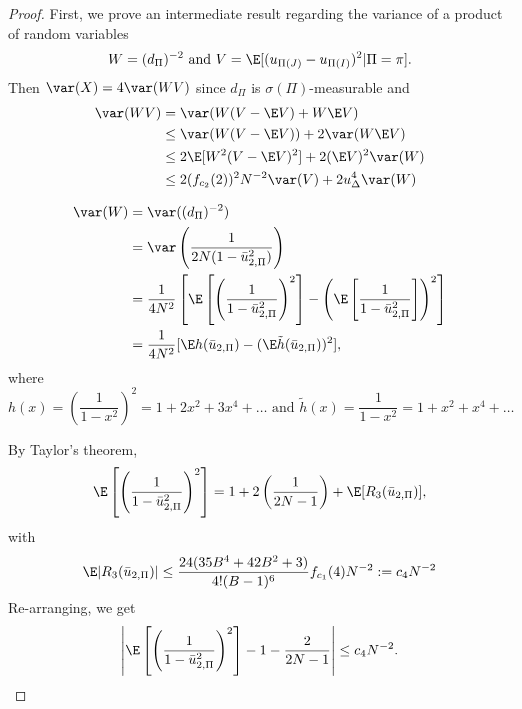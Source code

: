 \begin{proof}
  First, we prove an intermediate result regarding the variance of a product of random variables
  \begin{equation*}
    W = (d_{\Pi})^{-2} \text{ and } V = \E [(u_{\Pi(J)} - u_{\Pi(I)})^2 | \Pi = \pi].
  \end{equation*}
  Then $\var(X) = 4 \var(WV)$ since $d_{\Pi}$ is $\sigma(\Pi)$-measurable and 
  \begin{align}
    \label{E:var_prod}
    \var(WV) &= \var(W(V-\E V) + W \E V) \nonumber \\
    &\leq \var(W(V-\E V)) + 2 \var (W \E V) \nonumber \\
    &\leq 2 \E [W^2 (V-\E V)^2] + 2(\E V)^2 \var(W) \nonumber \\
    &\leq 2(f_{c_2}(2))^2 N^{-2} \var(V) + 2u_{\Delta}^4 \var(W)
  \end{align}
  
  \begin{align*}
    \var(W) &= \var ((d_{\Pi})^{-2}) \\
    &= \var \left ( \frac{1}{2N(1-\bar{u}_{2,\Pi}^2)} \right ) \\
    &= \frac{1}{4N^2} \left [ \E \left [ \left (\frac{1}{1-\bar{u}_{2,\Pi}^2}
        \right )^2 \right ] - 
      \left ( \E \left [ \frac{1}{1-\bar{u}_{2,\Pi}^2} \right ] \right )^2
    \right ] \\
    &= \frac{1}{4N^2}[\E h(\bar{u}_{2,\Pi}) - (\E \tilde{h}(\bar{u}_{2,\Pi}))^2],
  \end{align*}
  where 
  \begin{equation*}
    h(x) = \left ( \frac{1}{1-x^2} \right )^2 = 1 + 2x^2 + 3x^4 + \dots
      \text{ and } \tilde{h}(x) = \frac{1}{1-x^2} = 1 + x^2 + x^4 + \ldots
  \end{equation*}

  By Taylor's theorem,
  \begin{equation*}
    \E \left [ \left (\frac{1}{1-\bar{u}_{2,\Pi}^2} \right )^2 \right ] 
    = 1 + 2 \left ( \frac{1}{2N-1} \right ) + \E [R_3(\bar{u}_{2,\Pi})],
  \end{equation*}
  with
  \begin{equation*}
    \E |R_3(\bar{u}_{2,\Pi})| \leq \frac{24(35B^4 + 42 B^2 + 3)}{4!(B-1)^6}f_{c_1}(4) N^{-2}
    := c_4 N^{-2}
  \end{equation*}
  Re-arranging, we get
  \begin{equation*}
    \left | \E \left [ \left (\frac{1}{1-\bar{u}_{2,\Pi}^2} \right )^2 \right ] 
      - 1 - \frac{2}{2N-1} \right | \leq c_4 N^{-2}.
  \end{equation*}
  

\end{proof}
